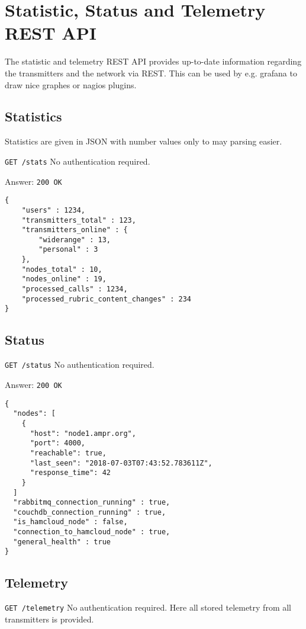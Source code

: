 \section{Statistic, Status and Telemetry REST API}
The statistic and telemetry REST API provides up-to-date information regarding the transmitters and the network via REST. This can be used by e.g. grafana to draw nice graphes or nagios plugins.


\subsection{Statistics}
Statistics are given in JSON with number values only to may parsing easier.

\texttt{GET /stats}
No authentication required. 

Answer:
\texttt{200 OK}
\begin{lstlisting}
{
	"users" : 1234,
	"transmitters_total" : 123,
	"transmitters_online" : {
		"widerange" : 13,
		"personal" : 3
	},
	"nodes_total" : 10,
	"nodes_online" : 19,
	"processed_calls" : 1234,
	"processed_rubric_content_changes" : 234	
}
\end{lstlisting}



\subsection{Status}
\texttt{GET /status}
No authentication required. 

Answer:
\texttt{200 OK}
\begin{lstlisting}
{
  "nodes": [
    {
      "host": "node1.ampr.org",
      "port": 4000,
      "reachable": true,
      "last_seen": "2018-07-03T07:43:52.783611Z",
      "response_time": 42
    }
  ]
  "rabbitmq_connection_running" : true,
  "couchdb_connection_running" : true,
  "is_hamcloud_node" : false,
  "connection_to_hamcloud_node" : true,
  "general_health" : true
}
\end{lstlisting}


\subsection{Telemetry}

\texttt{GET /telemetry}
No authentication required. Here all stored telemetry from all transmitters is provided.

